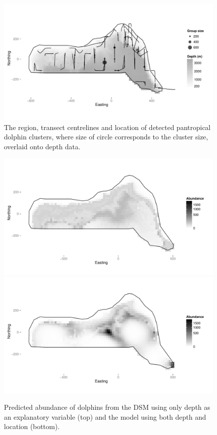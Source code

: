 \documentclass[a4paper,12pt]{article}
\begin{document}
\begin{figure}[h!]
  \caption{The region, transect centrelines and location of detected pantropical dolphin clusters, where size of circle corresponds to the cluster size, overlaid onto depth data.}
  \label{dolphin-eda}
  \begin{center}
    \includegraphics[width=\textwidth]{depth-transects}
  \end{center}
\end{figure}

\newpage

\begin{figure}[h!]
  \caption{Predicted abundance of dolphins from the DSM using only depth as an explanatory variable (top) and the model using both depth and location (bottom).}
  \label{fits-depth}
  \begin{center}
    \includegraphics[width=\textwidth]{fit-depth}\\
    \includegraphics[width=\textwidth]{fit-depth-xy}
  \end{center}
\end{figure}
\end{document}
